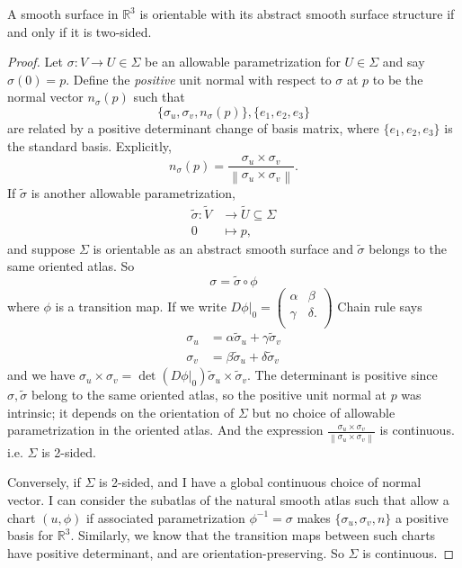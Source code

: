 \leavevmode
\begin{lemma}{}{}
    A smooth surface in \(\mathbb{R}^3\) is orientable with its abstract smooth surface structure if and only if it is two-sided.
\end{lemma}
\begin{proof}
    Let \(\sigma: V \to U \in \Sigma\) be an allowable parametrization for \(U\in \Sigma\) and say \(\sigma(0) = p\). Define the \textit{positive} unit normal with respect to \(\sigma\) at \(p\) to be the normal vector \(n_\sigma(p)\) such that
    \[
        \{\sigma_u,\sigma_v,n_\sigma(p)\}, \{e_1, e_2, e_3\}
    \]
    are related by a positive determinant change of basis matrix, where \(\{e_1, e_2, e_3\}\) is the standard basis. Explicitly,
    \[
        n_\sigma(p) = \frac{\sigma_u \times \sigma_v}{\left\lVert \sigma_{u}\times \sigma_{v}\right\rVert }.
    \]
    If \(\tilde{\sigma}\) is another allowable parametrization,
    \[
    \begin{aligned}
      \tilde{\sigma}\colon \tilde{V} & \longrightarrow   \tilde{U}\subseteq \Sigma \\
      0 &\longmapsto p,
    \end{aligned}
    \]
    and suppose \(\Sigma\) is orientable as an abstract smooth surface and \(\tilde{\sigma}\) belongs to the same oriented atlas. So
    \[
        \sigma = \tilde{\sigma} \circ \phi
    \]
    where \(\phi\) is a transition map. If we write \(\left. D\phi\right|_0 = \begin{pmatrix}
        \alpha &  \beta \\
        \gamma &  \delta. \\
    \end{pmatrix}\) Chain rule says
    \begin{align*}
        \sigma_u &=\alpha \tilde{\sigma}_u + \gamma\tilde{\sigma}_v\\
        \sigma_v &=\beta \tilde{\sigma}_u + \delta\tilde{\sigma}_v
    \end{align*}
    and we have \(\sigma_u \times \sigma_v = \det (\left. D\phi\right|_0)\tilde{\sigma}_u \times \tilde{\sigma}_v\). The determinant is positive since \(\sigma, \tilde{\sigma}\) belong to the same oriented atlas, so the positive unit normal at \(p\) was intrinsic; it depends on the orientation of \(\Sigma\) but no choice of allowable parametrization in the oriented atlas. And the expression \(\frac{\sigma_u \times \sigma_v}{\left\lVert \sigma_u \times \sigma_v\right\rVert }\) is continuous. i.e. \(\Sigma\) is 2-sided.

    Conversely, if \(\Sigma\) is 2-sided, and I have a global continuous choice of normal vector. I can consider the subatlas of the natural smooth atlas such that allow a chart \((u, \phi)\) if associated parametrization \(\phi^{-1}=\sigma\) makes \(\{\sigma_u, \sigma_v, n\}\) a positive basis for \(\mathbb{R}^3\). Similarly, we know that the transition maps between such charts have positive determinant, and are orientation-preserving. So \(\Sigma\) is continuous.
\end{proof}
